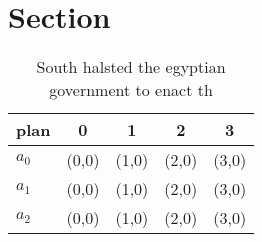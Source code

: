 \documentclass[a4paper]{article}
\begin{document}
\section{Section}

\begin{table}
\begin{adjustbox}{width=0.6\columnwidth}
\begin{tabular}{|l|l|l|l|l|}
\hline
\textbf{plan} & \multicolumn{1}{c|}{\textbf{0}} & \multicolumn{1}{c|}{\textbf{1}} & \multicolumn{1}{c|}{\textbf{2}} & \multicolumn{1}{c|}{\textbf{3}} \\ \hline
\textbf{$a_0$}  & (0,0) & (1,0) & (2,0) & (3,0) \\ \hline
\textbf{$a_1$}  & (0,0) & (1,0) & (2,0) & (3,0) \\ \hline
\textbf{$a_2$}  & (0,0) & (1,0) & (2,0) & (3,0) \\ \hline
\end{tabular}
\end{adjustbox}
\caption{South halsted the egyptian government to enact th
}
\end{table}
\end{document}
